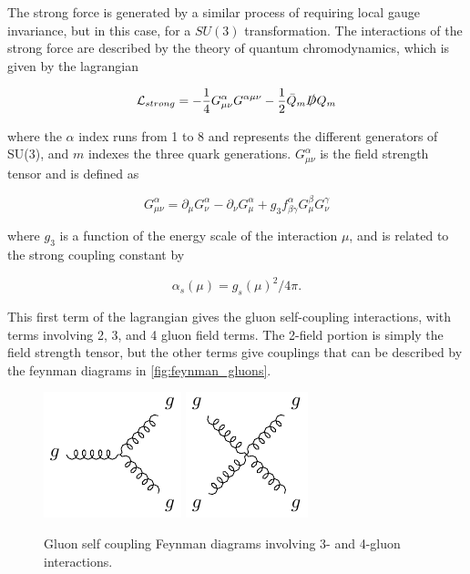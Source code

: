 The strong force is generated by a similar process of requiring local gauge invariance, but in this case, for a $SU(3)$ transformation. The interactions of the strong force are described by the theory of quantum chromodynamics, which is given by the lagrangian

\begin{equation}
\mathcal{L}_{strong} = -\frac{1}{4}G^\alpha_{\mu\nu}G^{\alpha\mu\nu} - \frac{1}{2}\bar{Q}_m \slashed{D} Q_m
\end{equation}

where the $\alpha$ index runs from 1 to 8 and represents the different generators of SU(3), and $m$ indexes the three quark generations. $G^\alpha_{\mu\nu}$ is the field strength tensor and is defined as

\begin{equation}
G^\alpha_{\mu\nu} = \partial_\mu G^\alpha_\nu - \partial_\nu G^\alpha_\mu + g_3 f^\alpha_{\beta\gamma}G^\beta_\mu G^\gamma_\nu
\end{equation}

where $g_3$ is a function of the energy scale of the interaction $\mu$, and is related to the strong coupling constant by

\begin{equation}
\alpha_s(\mu) =  g_s(\mu)^2 / 4\pi . 
\end{equation}

This first term of the lagrangian gives the gluon self-coupling interactions, with terms involving 2, 3, and 4 gluon field terms. The 2-field portion is simply the field strength tensor, but the other terms give couplings that can be described by the feynman diagrams in \autoref{fig:feynman_gluons}.

\begin{centering}
\begin{figure}[!hbt]
\myfloatalign
\includegraphics[width=.45\linewidth]{feynman/gluon_3.pdf}
\includegraphics[width=.4\linewidth]{feynman/gluon_4.pdf}
\caption{Gluon self coupling Feynman diagrams involving 3- and 4-gluon interactions.}
\label{fig:feynman_gluons}
\end{figure}
\end{centering}

